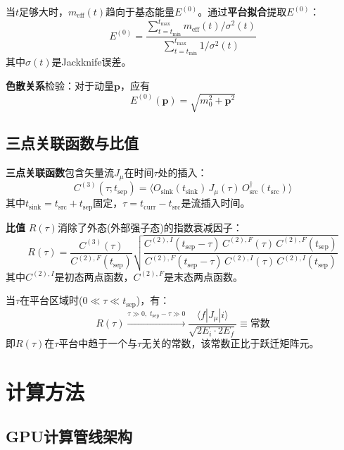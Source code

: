 \documentclass[11pt,a4paper]{article}
\newcommand{\meff}{m_{\mathrm{eff}}}
\newcommand{\tsep}{t_{\mathrm{sep}}}
\newcommand{\tsrc}{t_{\mathrm{src}}}
\newcommand{\tsink}{t_{\mathrm{sink}}}
\newcommand{\CtwoI}{C^{(2),I}}
\newcommand{\CtwoF}{C^{(2),F}}
\begin{document}
当$t$足够大时，$\meff(t)$趋向于基态能量$E^{(0)}$。通过\textbf{平台拟合}提取$E^{(0)}$：
\begin{equation}
E^{(0)} = \frac{\sum_{t=t_{\mathrm{min}}}^{t_{\mathrm{max}}}
\meff(t)/\sigma^2(t)}{\sum_{t=t_{\mathrm{min}}}^{t_{\mathrm{max}}} 1/\sigma^2(t)}
\end{equation}
其中$\sigma(t)$是Jackknife误差。

\textbf{色散关系}检验：对于动量$\bm{p}$，应有
\begin{equation}
E^{(0)}(\bm{p}) = \sqrt{m_0^2 + \bm{p}^2}
\label{eq:dispersion}
\end{equation}

\subsection{三点关联函数与比值}

\textbf{三点关联函数}包含矢量流$J_\mu$在时间$\tau$处的插入：
\begin{equation}
C^{(3)}(\tau; \tsep) = \langle O_{\mathrm{sink}}(\tsink)\,
J_\mu(\tau)\, O_{\mathrm{src}}^{\dagger}(\tsrc) \rangle
\label{eq:C3}
\end{equation}
其中$\tsink = \tsrc + \tsep$固定，$\tau = t_{\mathrm{curr}} - \tsrc$是流插入时间。

\textbf{比值} $R(\tau)$消除了外态(外部强子态)的指数衰减因子：
\begin{equation}
\boxed{
R(\tau) = \frac{C^{(3)}(\tau)}{\CtwoF(\tsep)}\sqrt{
\frac{\CtwoI(\tsep-\tau)\,\CtwoF(\tau)\,\CtwoF(\tsep)}
{\CtwoF(\tsep-\tau)\,\CtwoI(\tau)\,\CtwoI(\tsep)}}
}
\label{eq:ratio}
\end{equation}
其中$\CtwoI$是初态两点函数，$\CtwoF$是末态两点函数。

当$\tau$在平台区域时($0\ll\tau\ll\tsep$)，有：
\begin{equation}
R(\tau) \xrightarrow{\tau\gg 0,\;\tsep-\tau\gg 0}
\frac{\langle f|J_\mu|i\rangle}{\sqrt{2E_i\cdot 2E_f}} \equiv \text{常数}
\label{eq:ratio_plateau}
\end{equation}
即$R(\tau)$在$\tau$平台中趋于一个与$\tau$无关的常数，该常数正比于跃迁矩阵元。

\section{计算方法}

\subsection{GPU计算管线架构}
\end{document}
